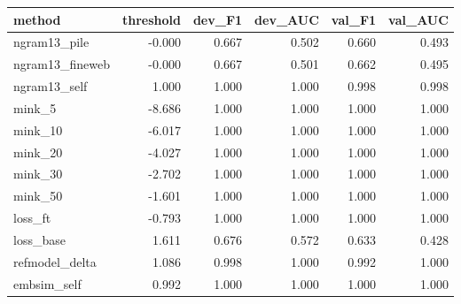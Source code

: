 \begin{tabular}{lrrrrr}
\toprule
method & threshold & dev_F1 & dev_AUC & val_F1 & val_AUC \\
\midrule
ngram13_pile & -0.000 & 0.667 & 0.502 & 0.660 & 0.493 \\
ngram13_fineweb & -0.000 & 0.667 & 0.501 & 0.662 & 0.495 \\
ngram13_self & 1.000 & 1.000 & 1.000 & 0.998 & 0.998 \\
mink_5 & -8.686 & 1.000 & 1.000 & 1.000 & 1.000 \\
mink_10 & -6.017 & 1.000 & 1.000 & 1.000 & 1.000 \\
mink_20 & -4.027 & 1.000 & 1.000 & 1.000 & 1.000 \\
mink_30 & -2.702 & 1.000 & 1.000 & 1.000 & 1.000 \\
mink_50 & -1.601 & 1.000 & 1.000 & 1.000 & 1.000 \\
loss_ft & -0.793 & 1.000 & 1.000 & 1.000 & 1.000 \\
loss_base & 1.611 & 0.676 & 0.572 & 0.633 & 0.428 \\
refmodel_delta & 1.086 & 0.998 & 1.000 & 0.992 & 1.000 \\
embsim_self & 0.992 & 1.000 & 1.000 & 1.000 & 1.000 \\
\bottomrule
\end{tabular}
